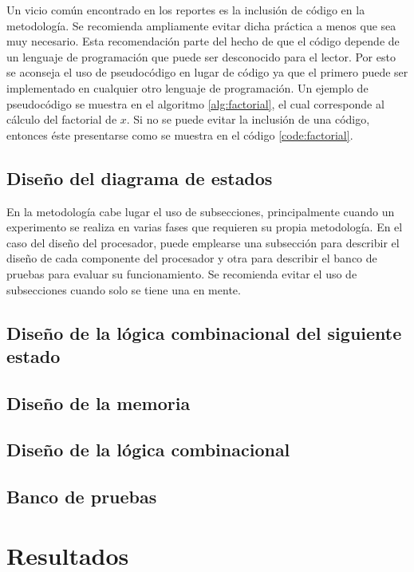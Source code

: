 \documentclass[10pt, twocolumn]{article}
\begin{document}
Un vicio común encontrado en los reportes es la inclusión de código en la metodología. Se recomienda ampliamente evitar dicha práctica a menos que sea muy necesario. Esta recomendación parte del hecho de que el código depende de un lenguaje de programación que puede ser desconocido para el lector. Por esto se aconseja el uso de pseudocódigo en lugar de código ya que el primero puede ser implementado en cualquier otro lenguaje de programación. Un ejemplo de pseudocódigo se muestra en el algoritmo \ref{alg:factorial}, el cual corresponde al cálculo del factorial de $x$. Si no se puede evitar la inclusión de una código, entonces éste presentarse como se muestra en el código \ref{code:factorial}.



\subsection{Diseño del diagrama de estados}
En la metodología cabe lugar el uso de subsecciones, principalmente cuando un experimento se realiza en varias fases que requieren su propia metodología. En el caso del diseño del procesador, puede emplearse una subsección para describir el diseño de cada componente del procesador y otra para describir el banco de pruebas para evaluar su funcionamiento. Se recomienda evitar el uso de subsecciones cuando solo se tiene una en mente.

\subsection{Diseño de la lógica combinacional del siguiente estado}

\subsection{Diseño de la memoria}

\subsection{Diseño de la lógica combinacional}

\subsection{Banco de pruebas}

\section{Resultados}\label{sec:results}
\end{document}
